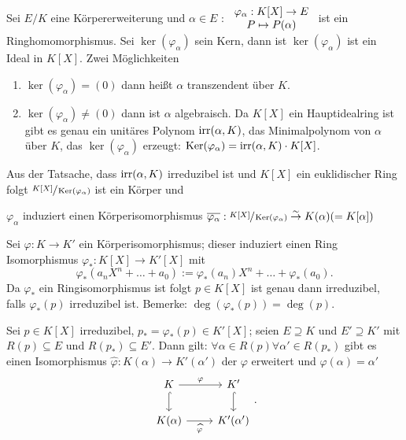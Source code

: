 \begin{definition}[Wiederholung]
	Sei $E / K$ eine Körpererweiterung und $\alpha \in E$ : $\begin{array}{c}  \varphi_{\alpha}: K[X] \to E\\ P \mapsto P(\alpha)\\ \end{array}$ ist ein Ringhomomorphismus.
Sei $\ker(\varphi_{\alpha})$ sein Kern, dann ist $\ker(\varphi_{\alpha})$ ist ein Ideal in $K[X]$.
Zwei Möglichkeiten
\begin{enumerate}[(1)]
	\item $\ker(\varphi_{\alpha}) = (0)$ dann heißt $\alpha$ transzendent über $K$.
	\item $\ker(\varphi_{\alpha}) \neq (0)$ dann ist $\alpha$ algebraisch.
		Da $K[X]$ ein Hauptidealring ist gibt es genau ein unitäres Polynom $\operatorname{irr}(\alpha,K)$,
		das Minimalpolynom von $\alpha$ über $K$, das $\ker(\varphi_{\alpha})$ erzeugt: $\operatorname{Ker}(\varphi_{\alpha}) = \operatorname{irr}(\alpha,K) \cdot K[X]$.
\end{enumerate}
\end{definition}

Aus der Tatsache, dass $\operatorname{irr}(\alpha,K)$ irreduzibel ist und $K[X]$ ein euklidischer Ring folgt $\sfrac{K[X]}{\operatorname{Ker}(\varphi_{\alpha})}$ ist ein Körper und
\begin{lemma}
	$\varphi_{\alpha}$ induziert einen Körperisomorphismus $\overline{\varphi_{\alpha}}: \sfrac{K[X]}{\operatorname{Ker}(\varphi_{\alpha})} \overset{\sim}{\to} K(\alpha) (= K[\alpha])$
\end{lemma}

Sei $\varphi: K \to K'$ ein Körperisomorphismus; dieser induziert einen Ring Isomorphismus $\varphi_{*}: K[X] \to K'[X]$ mit
\[
	\varphi_{*}(a_{n}X^{n} + \ldots + a_0) := \varphi_{*}(a_{n}) X^{n} + \ldots + \varphi_{*}(a_{0})
.\] 
Da $\varphi_{*}$ ein Ringisomorphismus ist folgt $p \in K[X]$ ist genau dann irreduzibel, falls $\varphi_{*}(p)$ irreduzibel ist.
Bemerke: $\deg(\varphi_{*}(p)) = \deg(p)$.

\begin{lemma}
	Sei $p \in K[X]$ irreduzibel, $p_{*} = \varphi_{*}(p) \in K'[X]$; seien $E \supseteq K$ und $E' \supseteq K'$ mit $R(p) \subseteq E$ und $R(p_{*}) \subseteq E'$.
	Dann gilt: $\forall \alpha \in R(p) \forall \alpha' \in R(p_{*})$ gibt es einen Isomorphismus $\widehat{\varphi}: K(\alpha) \to K'(\alpha')$ der $\varphi$ erweitert
	und $\widehat{\varphi}(\alpha) = \alpha'$
	\[
		\begin{tikzcd}
			K \arrow[r, "\varphi"] \arrow[d, hook]    & K' \arrow[d, hook] \\
			K(\alpha) \arrow[r, "\widehat{\varphi}"'] & K'(\alpha')       
		\end{tikzcd}
	.\]
\end{lemma}

